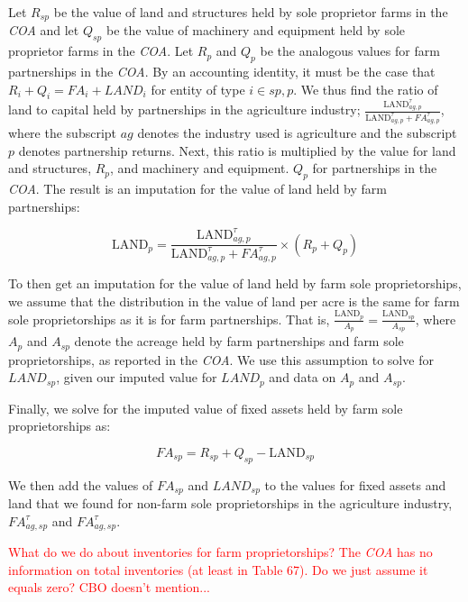 \documentclass[article,11pt,letterpaper,fleqn]{article}
\theoremstyle{definition}
\numberwithin{equation}{section}
\begin{document}
Let $R_{sp}$ be the value of land and structures held by sole proprietor farms in the \emph{COA} and let $Q_{sp}$ be the value of machinery and equipment held by sole proprietor farms in the \emph{COA}.  Let $R_{p}$ and $Q_{p}$ be the analogous values for farm partnerships in the \emph{COA}.  By an accounting identity, it must be the case that $R_{i}+Q_{i}={FA}_{i}+{LAND}_{i}$ for entity of type $i\in{sp,p}$.  We thus find the ratio of land to capital held by partnerships in the agriculture industry; $\frac{\text{LAND}^{\tau}_{ag,p}}{{\text{LAND}^{\tau}_{ag,p}}+{FA}^{\tau}_{ag,p}}$, where the subscript $ag$ denotes the industry used is agriculture and the subscript $p$ denotes partnership returns. Next, this ratio is multiplied by the value for land and structures, $R_{p}$, and machinery and equipment. $Q_{p}$ for partnerships in the \emph{COA}.  The result is an imputation for the value of land held by farm partnerships: 

\begin{equation}
\text{LAND}_{p}= \frac{\text{LAND}^{\tau}_{ag,p}}{\text{LAND}^{\tau}_{ag,p}+{FA}^{\tau}_{ag,p}}\times (R_{p}+Q_{p})
\end{equation}

To then get an imputation for the value of land held by farm sole proprietorships, we assume that the distribution in the value of land per acre is the same for farm sole proprietorships as it is for farm partnerships.  That is, $\frac{\text{LAND}_{p}}{A_{p}}=\frac{\text{LAND}_{sp}}{A_{sp}}$, where $A_{p}$ and $A_{sp}$ denote the acreage held by farm partnerships and farm sole proprietorships, as reported in the \emph{COA}.  We use this assumption to solve for ${LAND}_{sp}$, given our imputed value for ${LAND}_{p}$ and data on $A_{p}$ and ${A}_{sp}$.  

Finally, we solve for the imputed value of fixed assets held by farm sole proprietorships as: 

\begin{equation}
{FA}_{sp}=R_{sp}+Q_{sp}-\text{LAND}_{sp}
\end{equation}

We then add the values of ${FA}_{sp}$ and ${LAND}_{sp}$ to the values for fixed assets and land that we found for non-farm sole proprietorships in the agriculture industry, ${FA}^{\tau}_{ag,sp}$ and ${FA}^{\tau}_{ag,sp}$.

\textcolor{red}{What do we do about inventories for farm proprietorships?  The \emph{COA} has no information on total inventories (at least in Table 67).   Do we just assume it equals zero?  CBO doesn't mention...}
\end{document}
